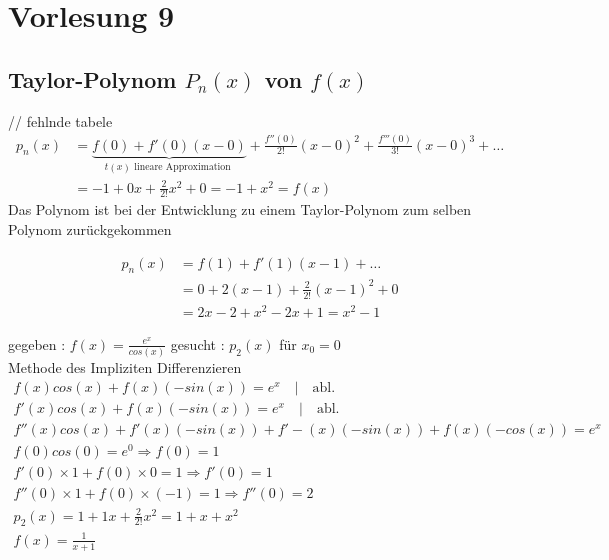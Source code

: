 \section{Vorlesung 9}
\subsection{Taylor-Polynom $P_n(x)$ von $f(x)$}
// fehlnde tabele
\begin{align*}
p_n(x) &= \underbrace{f(0) + f'(0)(x-0)}_{t(x) \text{ lineare Approximation }}  + \frac{f''(0)}{2!}(x-0)^2 + \frac{f'''(0)}{3!}(x-0)^3 + \dots\\
&= -1 + 0 x + \frac{2}{2!} x^2 + 0 = -1 + x^2 = f(x)
\end{align*}
Das Polynom ist bei der Entwicklung zu einem Taylor-Polynom zum selben Polynom zurückgekommen

\begin{align*}
p_n(x)&= f(1) + f'(1)(x-1)+ \dots \\
&= 0 + 2(x-1) + \frac{2}{2!}(x-1)^2 + 0 \\
&= 2x -2 + x^2 -2x +1 = x^2 -1
\end{align*} 

\begin{example}
gegeben : $f(x) = \frac{e^x}{cos(x)}$  gesucht : $p_2(x)$ für $x_0=0$\\
Methode des Impliziten Differenzieren 
\begin{gather*}
f(x) cos(x) + f(x)(-sin(x)) = e^x \quad | \quad \text{abl.} \\
f'(x) cos(x) + f(x)(-sin(x))= e^x \quad | \quad \text{abl.} \\
f''(x)cos(x) + f'(x)(-sin(x))+ f'-(x)(-sin(x)) + f(x)(- cos(x)) = e^x \\
f(0)cos(0) = e^0 \Rightarrow f(0) = 1\\
f'(0)\times 1 + f(0) \times 0 = 1 \Rightarrow f'(0) = 1\\
f''(0)\times 1 + f(0) \times (-1) = 1 \Rightarrow f''(0) = 2\\
p_2(x) = 1 + 1 x + \frac{2}{2!}x^2 = 1 + x + x^2\\
f(x) = \frac{1}{x+1}
\end{gather*}
\end{example}

